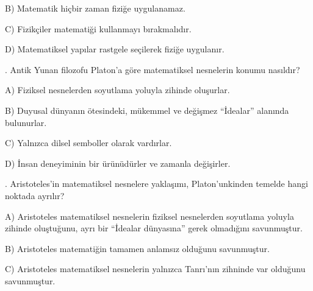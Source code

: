 \par\noindent\hspace*{1.6em}B) Matematik hiçbir zaman fiziğe uygulanamaz.

\par\noindent\hspace*{1.6em}C) Fizikçiler matematiği kullanmayı bırakmalıdır.

\par\noindent\hspace*{1.6em}D) Matematiksel yapılar rastgele seçilerek fiziğe uygulanır.

\par\smallskip{}. Antik Yunan filozofu Platon’a göre matematiksel nesnelerin konumu nasıldır?

\par\noindent\hspace*{1.6em}A) Fiziksel nesnelerden soyutlama yoluyla zihinde oluşurlar.

\par\noindent\hspace*{1.6em}B) Duyusal dünyanın ötesindeki, mükemmel ve değişmez “İdealar” alanında bulunurlar.

\par\noindent\hspace*{1.6em}C) Yalnızca dilsel semboller olarak vardırlar.

\par\noindent\hspace*{1.6em}D) İnsan deneyiminin bir ürünüdürler ve zamanla değişirler.

\par\smallskip{}. Aristoteles’in matematiksel nesnelere yaklaşımı, Platon’unkinden temelde hangi noktada ayrılır?

\par\noindent\hspace*{1.6em}A) Aristoteles matematiksel nesnelerin fiziksel nesnelerden soyutlama yoluyla zihinde oluştuğunu, ayrı bir “İdealar dünyasına” gerek olmadığını savunmuştur.

\par\noindent\hspace*{1.6em}B) Aristoteles matematiğin tamamen anlamsız olduğunu savunmuştur.

\par\noindent\hspace*{1.6em}C) Aristoteles matematiksel nesnelerin yalnızca Tanrı’nın zihninde var olduğunu savunmuştur.

